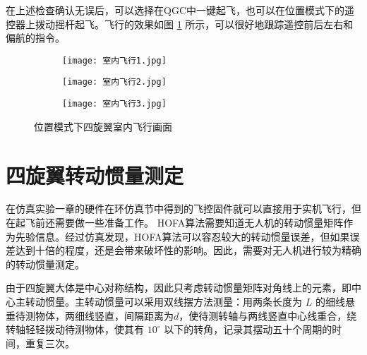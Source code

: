 在上述检查确认无误后，可以选择在QGC中一键起飞，也可以在位置模式下的遥控器上拨动摇杆起飞。飞行的效果如图 \ref{室内飞行} 所示，可以很好地跟踪遥控前后左右和偏航的指令。
\begin{figure}[h]
  \centering
  \begin{subfigure}[c]{0.33\textwidth}
    \centering
    \texttt{[image: 室内飞行1.jpg]}
  \end{subfigure} \hfill
  \begin{subfigure}[c]{0.33\textwidth}
    \centering
    \texttt{[image: 室内飞行2.jpg]}
  \end{subfigure}\hfill
    \begin{subfigure}[c]{0.33\textwidth}
      \centering
      \texttt{[image: 室内飞行3.jpg]}
  \end{subfigure}
  \caption{位置模式下四旋翼室内飞行画面}
  \label{室内飞行}
  \end{figure}
\newpage
  \section{四旋翼转动惯量测定}
  在仿真实验一章的硬件在环仿真节中得到的飞控固件就可以直接用于实机飞行，但在起飞前还需要做一些准备工作。
  HOFA算法需要知道无人机的转动惯量矩阵作为先验信息。经过仿真发现，HOFA算法可以容忍较大的转动惯量误差，但如果误差达到十倍的程度，还是会带来破坏性的影响。因此，需要对无人机进行较为精确的转动惯量测定。

  由于四旋翼大体是中心对称结构，因此只考虑转动惯量矩阵对角线上的元素，即中心主转动惯量。主转动惯量可以采用双线摆方法测量\cite{转动惯量}：用两条长度为 $L$ 的细线悬垂待测物体，两细线竖直，间隔距离为$d$，使待测转轴与两线竖直中心线重合，绕转轴轻轻拨动待测物体，使其有 $10 ^\circ$ 以下的转角，记录其摆动五十个周期的时间，重复三次。

